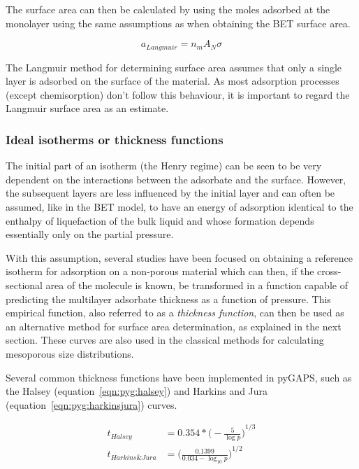 The surface area can then be calculated by using the moles adsorbed at the
monolayer using the same assumptions as when obtaining the BET surface area.

\begin{equation}
	a_{Langmuir} = n_m A_N \sigma
\end{equation}

The Langmuir method for determining surface area assumes that only a single
layer is adsorbed on the surface of the material. As most adsorption processes
(except chemisorption) don't follow this behaviour, it is important to regard
the Langmuir surface area as an estimate.

\subsubsection{Ideal isotherms or thickness functions}

The initial part of an isotherm (the Henry regime) can be seen to 
be very dependent on the interactions between the adsorbate and the
surface. However, the subsequent layers are less influenced by the
initial layer and can often be assumed, like in the BET model, 
to have an energy of adsorption identical to the enthalpy of liquefaction
of the bulk liquid and whose formation depends essentially only on 
the partial pressure.

With this assumption, several studies have been focused on obtaining
a reference isotherm for adsorption on a non-porous material which can
then, if the cross-sectional area of the molecule is known, be transformed
in a function capable of predicting the multilayer adsorbate thickness
as a function of pressure. This empirical function, also referred to as a
\textit{thickness function}, can then be used as an alternative
method for surface area determination, as explained in the next section.
These curves are also used in the classical methods for calculating
mesoporous size distributions.

Several common thickness functions have been implemented in pyGAPS,
such as the Halsey (equation~\ref{eqn:pyg:halsey}) and 
Harkins and Jura (equation~\ref{eqn:pyg:harkinsjura}) curves.

\begin{align}
	t_{Halsey} &= 0.354 * {\Big(-\frac{5}{\log{p}}\Big)}^{1/3} \label{eqn:pyg:halsey} \\
	t_{Harkins\&Jura} &= {\Big(\frac{0.1399}{0.034 - \log_{10}p}\Big)}^{1/2} \label{eqn:pyg:harkinsjura}
\end{align}

